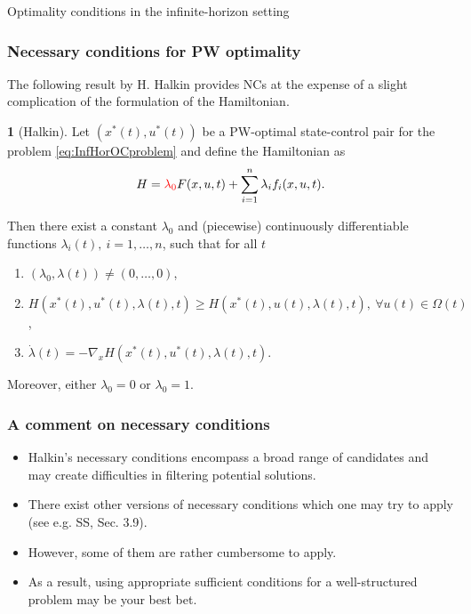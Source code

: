 \documentclass[10pt]{beamer}
\theoremstyle{definition}
\newtheorem{Fact}{\translate{Fact}}
\begin{document}
\begin{section}{Optimality conditions in the infinite-horizon setting}\label{sec:NCsSCs}

\begin{frame}[fragile]
\frametitle{Necessary conditions for PW optimality}
The following result by H. Halkin provides NCs at the expense of a slight complication of the formulation of the Hamiltonian.

\begin{Fact}[Halkin]
Let $ (x^*(t),u^*(t) ) $ be a PW-optimal state-control pair for the problem \eqref{eq:InfHorOCproblem} and define the Hamiltonian as \begin{equation}
H = \textcolor{red}{\lambda_0} F(x,u,t) + \sum_{i=1}^{n}\lambda_i f_i(x,u,t).
\label{eq:HamiltP0}
\end{equation}

Then there exist a constant $ \lambda_0 $ and (piecewise) continuously differentiable functions $ \lambda_i(t),~i=1,\ldots,n $, such that for all $ t $
\begin{enumerate}
\item $ (\lambda_0,\lambda(t)) \neq (0,\ldots,0)$,
\item $ H(x^*(t),u^*(t),\lambda(t),t )\geq H(x^*(t),u(t),\lambda(t),t ),~\forall u(t)\in \Omega(t) $,
\item $ \dot{\lambda}(t) = -\nabla_x H(x^*(t),u^*(t),\lambda(t),t) $.
\end{enumerate}

Moreover, either $ \lambda_0=0 $ or $ \lambda_0=1 $.
\label{fc:HalkinNCs}
\end{Fact}
\end{frame}

\begin{frame}[fragile]
\frametitle{A comment on necessary conditions}
\begin{itemize}\itemsep1em
\item Halkin's necessary conditions encompass a broad range of candidates and may create difficulties in filtering potential solutions.
\item There exist other versions of necessary conditions which one may try to apply (see e.g. SS, Sec. 3.9).
\item However, some of them are rather cumbersome to apply.
\item As a result, using appropriate sufficient conditions for a well-structured problem may be your best bet.
\end{itemize}
\end{frame}


\end{section}
\end{document}
